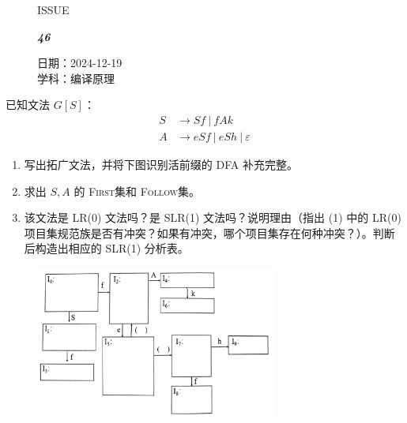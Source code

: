 \documentclass[UTF8]{ctexart}
\newcommand\FIRST{\textsc{First}}
\newcommand\FOLLOW{\textsc{Follow}}
\newcommand\Black[1]{\textcolor[gray]{0.3}{#1}}
\newcommand\Brown[1]{\textcolor[HTML]{998A4E}{#1}}
\newcommand\IssueNumber{46}
\newcommand\Date{2024-12-19}
\newcommand\Subject{编译原理}
\begin{document}
\begin{figure}[H]
\hspace{1cm}
\begin{minipage}[t]{0.3\textwidth}
\centering
    \Brown{\Genshin ISSUE}

    \vspace{-0.6cm}
    \Huge \Issue\slshape\bfseries\Black{\IssueNumber}
\end{minipage}
\hfill
\begin{minipage}[t]{0.28\textwidth}
\centering
    \Brown{日期：\Date} \\
\vspace{-0.1cm}
    \Brown{学科：\Subject} \\
\end{minipage}
\hspace{0.8cm}
\end{figure}

{\color{cyan!50!black}
已知文法 $G[S]$：
\begin{align*}
  S & \to Sf \ |\  fAk \\
  A & \to eSf \ |\  eSh \ |\  \varepsilon
\end{align*}
\begin{enumerate}[itemsep=0pt,parsep=0pt,label=(\theenumi)]
  \item 写出拓广文法，并将下图识别活前缀的 DFA 补充完整。
  \item 求出 $S,A$ 的 \FIRST 集和 \FOLLOW 集。
  \item 该文法是 LR(0) 文法吗？是 SLR(1) 文法吗？说明理由（指出 (1) 中的 LR(0) 项目集规范族是否有冲突？如果有冲突，哪个项目集存在何种冲突？）。判断后构造出相应的 SLR(1) 分析表。
\end{enumerate}
\begin{figure}[htb]
  \centering
  \includegraphics[width=8cm]{题目.png}
\end{figure}
}
\end{document}
